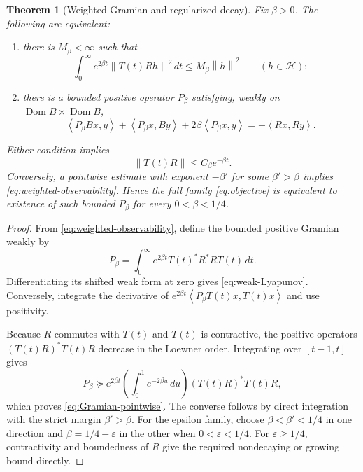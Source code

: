 \documentclass[11pt]{amsart}
\newtheorem{theorem}{Theorem}[section]
\theoremstyle{definition}
\theoremstyle{remark}
\DeclareMathOperator{\Dom}{Dom}
\newcommand{\Hcal}{\mathcal H}
\newcommand{\eps}{\varepsilon}
\newcommand{\ip}[2]{\left\langle #1,#2\right\rangle}
\newcommand{\norm}[1]{\left\lVert #1\right\rVert}
\begin{document}
\begin{theorem}[Weighted Gramian and regularized decay]
\label{thm:weighted-Gramian}
Fix $\beta>0$.  The following are equivalent:
\begin{enumerate}[label=\textup{(\roman*)}]
 \item there is $M_\beta<\infty$ such that
 \begin{equation}\label{eq:weighted-observability}
  \int_0^\infty e^{2\beta t}\norm{T(t)Rh}^2\,dt
  \leq M_\beta\norm h^2
  \qquad(h\in\Hcal);
 \end{equation}
 \item there is a bounded positive operator $P_\beta$ satisfying, weakly on
 $\Dom B\times\Dom B$,
 \begin{equation}\label{eq:weak-Lyapunov}
  \ip{P_\beta Bx}{y}+\ip{P_\beta x}{By}
  +2\beta\ip{P_\beta x}{y}
  =-\ip{Rx}{Ry}.
 \end{equation}
\end{enumerate}
Either condition implies
\begin{equation}\label{eq:Gramian-pointwise}
 \norm{T(t)R}\leq C_\beta e^{-\beta t}.
\end{equation}
Conversely, a pointwise estimate with exponent $-\beta'$ for some
$\beta'>\beta$ implies \eqref{eq:weighted-observability}.  Hence the full
family \eqref{eq:objective} is equivalent to existence of such bounded
$P_\beta$ for every $0<\beta<1/4$.
\end{theorem}

\begin{proof}
From \eqref{eq:weighted-observability}, define the bounded positive Gramian
weakly by
\[
 P_\beta=\int_0^\infty e^{2\beta t}
 T(t)^*R^*RT(t)\,dt.
\]
Differentiating its shifted weak form at zero gives
\eqref{eq:weak-Lyapunov}.  Conversely, integrate the derivative of
$e^{2\beta t}\ip{P_\beta T(t)x}{T(t)x}$ and use positivity.

Because $R$ commutes with $T(t)$ and $T(t)$ is contractive, the positive
operators $(T(t)R)^*T(t)R$ decrease in the Loewner order.  Integrating over
$[t-1,t]$ gives
\[
 P_\beta\succeq e^{2\beta t}
 \left(\int_0^1e^{-2\beta u}\,du\right)(T(t)R)^*T(t)R,
\]
which proves \eqref{eq:Gramian-pointwise}.  The converse follows by direct
integration with the strict margin $\beta'>\beta$.  For the epsilon family,
choose $\beta<\beta'<1/4$ in one direction and
$\beta=1/4-\eps$ in the other when $0<\eps<1/4$.  For
$\eps\geq1/4$, contractivity and boundedness of $R$ give the required
nondecaying or growing bound directly.
\end{proof}
\end{document}
